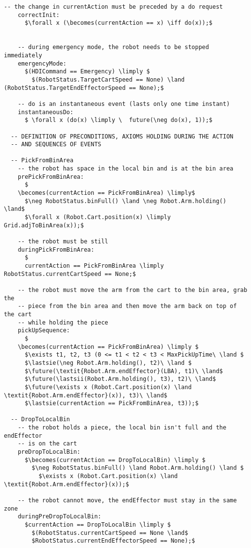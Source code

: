 \begin{lstlisting}[fontadjust, mathescape, frame=single]
    -- the change in currentAction must be preceded by a do request
    correctInit:
      $\forall x (\becomes(currentAction == x) \iff do(x));$

    
    -- during emergency mode, the robot needs to be stopped immediately
    emergencyMode:
      $(HDICommand == Emergency) \limply $
        $(RobotStatus.TargetCartSpeed == None) \land (RobotStatus.TargetEndEffectorSpeed == None);$

    -- do is an instantaneous event (lasts only one time instant)
    instantaneousDo:
      $ \forall x (do(x) \limply \  future(\neg do(x), 1));$

  -- DEFINITION OF PRECONDITIONS, AXIOMS HOLDING DURING THE ACTION 
  -- AND SEQUENCES OF EVENTS

  -- PickFromBinArea
    -- the robot has space in the local bin and is at the bin area
    prePickFromBinArea:
      $
    \becomes(currentAction == PickFromBinArea) \limply$
      $\neg RobotStatus.binFull() \land \neg Robot.Arm.holding() \land$
      $\forall x (Robot.Cart.position(x) \limply Grid.adjToBinArea(x));$

    -- the robot must be still
    duringPickFromBinArea:
      $
      currentAction == PickFromBinArea \limply RobotStatus.currentCartSpeed == None;$

    -- the robot must move the arm from the cart to the bin area, grab the 
    -- piece from the bin area and then move the arm back on top of the cart 
    -- while holding the piece
    pickUpSequence:
      $
    \becomes(currentAction == PickFromBinArea) \limply $
      $\exists t1, t2, t3 (0 <= t1 < t2 < t3 < MaxPickUpTime\ \land $ 
      $\lastsie(\neg Robot.Arm.holding(), t2)\ \land $
      $\future(\textit{Robot.Arm.endEffector}(LBA), t1)\ \land$
      $\future(\lastsii(Robot.Arm.holding(), t3), t2)\ \land$
      $\future(\exists x (Robot.Cart.position(x) \land \textit{Robot.Arm.endEffector}(x)), t3)\ \land$
      $\lastsie(currentAction == PickFromBinArea, t3));$
      
  -- DropToLocalBin
    -- the robot holds a piece, the local bin isn't full and the endEffector 
    -- is on the cart
    preDropToLocalBin:
      $\becomes(currentAction == DropToLocalBin) \limply $
        $\neg RobotStatus.binFull() \land Robot.Arm.holding() \land $
          $\exists x (Robot.Cart.position(x) \land \textit{Robot.Arm.endEffector}(x));$
    
    -- the robot cannot move, the endEffector must stay in the same zone
    duringPreDropToLocalBin:
      $currentAction == DropToLocalBin \limply $
        $(RobotStatus.currentCartSpeed == None \land$
        $RobotStatus.currentEndEffectorSpeed == None);$
  

\end{lstlisting}
